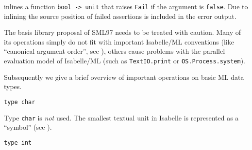 \begin{isabellebody}
\begin{isamarkuptext}
  \begin{description}

  \item {} inlines a function
  \verb|bool -> unit| that raises \verb|Fail| if the argument is
  \verb|false|.  Due to inlining the source position of failed
  assertions is included in the error output.

  \end{description}%
\end{isamarkuptext}%
\isamarkuptrue%
%
\endisatagmlantiq
{\isafoldmlantiq}%
%
\isadelimmlantiq
%
\endisadelimmlantiq
%
\isamarkuptrue%
%
\begin{isamarkuptext}%
The basis library proposal of SML97 needs to be treated with
  caution.  Many of its operations simply do not fit with important
  Isabelle/ML conventions (like ``canonical argument order'', see
  ), others cause problems with
  the parallel evaluation model of Isabelle/ML (such as \verb|TextIO.print| or \verb|OS.Process.system|).

  Subsequently we give a brief overview of important operations on
  basic ML data types.%
\end{isamarkuptext}%
\isamarkuptrue%
%
\isamarkuptrue%
%
\isadelimmlref
%
\endisadelimmlref
%
\isatagmlref
%
\begin{isamarkuptext}%
\begin{mldecls}
  \verb|type char| \\
  \end{mldecls}

  \begin{description}

  \item Type \verb|char| is \emph{not} used.  The smallest textual
  unit in Isabelle is represented as a ``symbol'' (see
  ).

  \end{description}%
\end{isamarkuptext}%
\isamarkuptrue%
%
\endisatagmlref
{\isafoldmlref}%
%
\isadelimmlref
%
\endisadelimmlref
%
\isamarkuptrue%
%
\isadelimmlref
%
\endisadelimmlref
%
\isatagmlref
%
\begin{isamarkuptext}%
\begin{mldecls}
  \verb|type int| \\
  \end{mldecls}


\end{isamarkuptext}
\end{isabellebody}
